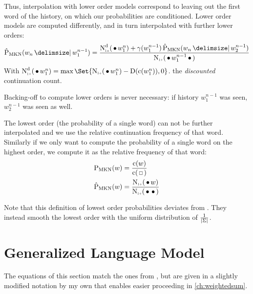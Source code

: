 Thus, interpolation with lower order models correspond to leaving out the first
word of the history, on which our probabilities are conditioned.
Lower order models are computed differently, and in turn interpolated with
further lower orders:
\begin{equation}
  \label{eq:mkn-low}
  \ProbMKN*{w_n}{w_1^{n-1}} =
    \frac{\DiscountedCount*(\WSkp w_1^n) + \gamma(w_1^{n-1}) \ProbMKN*{w_n}{w_2^{n-1}}}
         {\ContCountIp(\WSkp w_1^{n-1} \WSkp)} \\
\end{equation}
With
${\DiscountedCount*(\WSkp w_1^n) = \max\Set{ \ContCountIp(\WSkp w_1^n) - \Discount(\Count(w_1^n)), 0 }}$.
the \emph{discounted} continuation count.

Backing-off to compute lower orders is never necessary:
if history $w_1^{n-1}$ was seen, $w_2^{n-1}$ was seen as well.

The lowest order (the probability of a single word) can not be further
interpolated and we use the relative continuation frequency of that word.
Similarly if we only want to compute the probability of a single word on the
highest order, we compute it as the relative frequency of that word:
\begin{subequations}
  \label{eq:mkn-lowest}
  \begin{align}
    \label{eq:mkn-lowest-abs}
    \ProbMKN {w} &= \frac{\Count(w)}{\Count(\Skp)} \\
    \label{eq:mkn-lowest-cont}
    \ProbMKN*{w} &= \frac{\ContCountIp(\WSkp w)}{\ContCountIp(\WSkp \WSkp)}
  \end{align}
\end{subequations}

Note that this definition of lowest order probabilities deviates from
\textcite{ChenGoodman1999}.
They instead smooth the lowest order with the uniform distribution of
$\frac{1}{\left|\Sigma\right|}$.


\section{Generalized Language Model}
\label{sec:review-lm-glm}

The equations of this section match the ones from \textcite{Pickhardt2014},
but are given in a slightly modified notation by my own that enables easier
proceeding in \cref{ch:weightedsum}.

